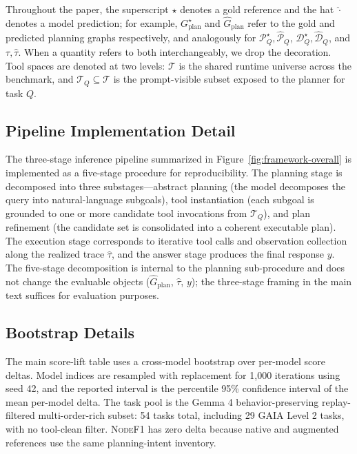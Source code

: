 \documentclass{article}
\providecommand{\metric}[1]{\textsc{#1}}
\begin{document}
Throughout the paper, the superscript $\star$ denotes a gold reference and the hat $\widehat{\cdot}$ denotes a model prediction; for example, $G_{\text{plan}}^\star$ and $\widehat{G}_{\text{plan}}$ refer to the gold and predicted planning graphs respectively, and analogously for $\mathcal{P}_Q^\star, \widehat{\mathcal{P}}_Q$, $\mathcal{D}_Q^\star, \widehat{\mathcal{D}}_Q$, and $\tau, \widehat{\tau}$. When a quantity refers to both interchangeably, we drop the decoration. Tool spaces are denoted at two levels: $\mathcal{T}$ is the shared runtime universe across the benchmark, and $\mathcal{T}_Q \subseteq \mathcal{T}$ is the prompt-visible subset exposed to the planner for task $Q$.

\subsection{Pipeline Implementation Detail}
\label{sec:appendix-pipeline-detail}

The three-stage inference pipeline summarized in Figure~\ref{fig:framework-overall} is implemented as a five-stage procedure for reproducibility. The planning stage is decomposed into three substages---abstract planning (the model decomposes the query into natural-language subgoals), tool instantiation (each subgoal is grounded to one or more candidate tool invocations from $\mathcal{T}_Q$), and plan refinement (the candidate set is consolidated into a coherent executable plan). The execution stage corresponds to iterative tool calls and observation collection along the realized trace $\widehat{\tau}$, and the answer stage produces the final response $y$. The five-stage decomposition is internal to the planning sub-procedure and does not change the evaluable objects ($\widehat{G}_{\text{plan}}$, $\widehat{\tau}$, $y$); the three-stage framing in the main text suffices for evaluation purposes.

\subsection{Bootstrap Details}
\label{sec:appendix-bootstrap-current}

The main score-lift table uses a cross-model bootstrap over per-model score deltas. Model indices are resampled with replacement for 1{,}000 iterations using seed 42, and the reported interval is the percentile 95\% confidence interval of the mean per-model delta. The task pool is the Gemma 4 behavior-preserving replay-filtered multi-order-rich subset: 54 tasks total, including 29 GAIA Level 2 tasks, with no tool-clean filter. \metric{NodeF1} has zero delta because native and augmented references use the same planning-intent inventory.
\end{document}
